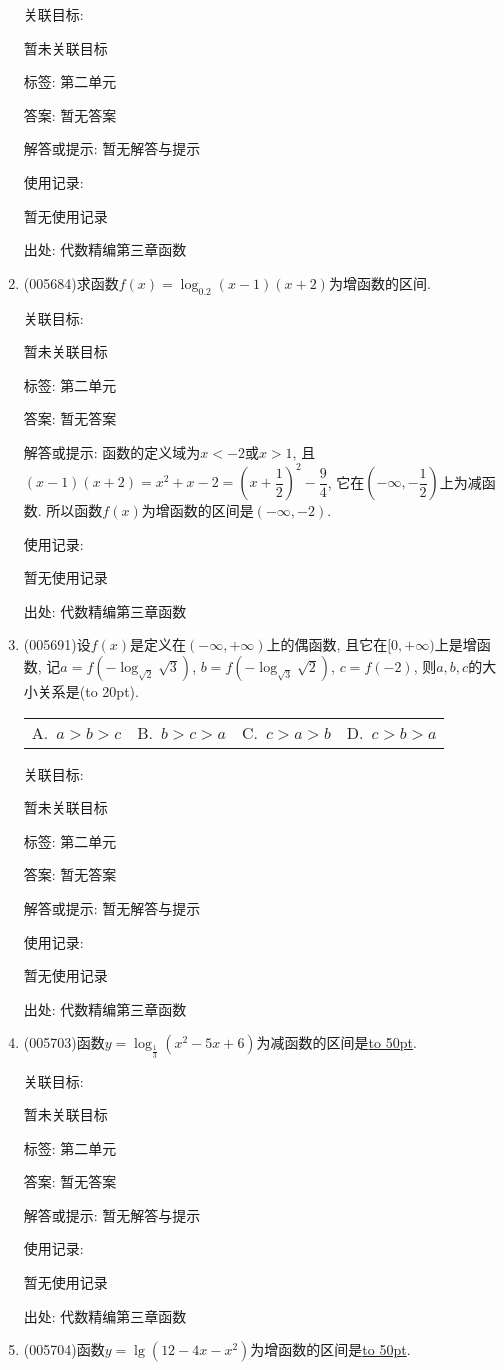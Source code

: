 \documentclass[10pt,a4paper]{article}
\newcommand{\blank}[1]{\underline{\hbox to #1pt{}}}
\newcommand{\bracket}[1]{(\hbox to #1pt{})}
\newcommand{\fourch}[4]{\par\begin{tabular}{p{.23\textwidth}p{.23\textwidth}p{.23\textwidth}p{.23\textwidth}}
A.~#1 &B.~#2& C.~#3& D.~#4
\end{tabular}}
\begin{document}
\begin{enumerate}[1.]
关联目标:

暂未关联目标



标签: 第二单元

答案: 暂无答案

解答或提示: 暂无解答与提示

使用记录:

暂无使用记录


出处: 代数精编第三章函数
\item { (005684)}求函数$f(x)=\log_{0.2}(x-1)(x+2)$为增函数的区间.


关联目标:

暂未关联目标



标签: 第二单元

答案: 暂无答案

解答或提示: 函数的定义域为$x<-2$或$x>1$, 且$(x-1)(x+2)=x^2+x-2=(x+\dfrac 12)^2-\dfrac 94$, 它在$(-\infty ,-\dfrac 12)$上为减函数.
所以函数$f(x)$为增函数的区间是$(-\infty ,-2)$.

使用记录:

暂无使用记录


出处: 代数精编第三章函数
\item { (005691)}设$f(x)$是定义在$(-\infty ,+\infty)$上的偶函数, 且它在$[0,+\infty)$上是增函数, 记$a=f(-\log_{\sqrt 2}\sqrt 3)$, $b=f(-\log_{\sqrt 3}\sqrt 2)$, $c=f(-2)$, 则$a,b,c$的大小关系是\bracket{20}.
\fourch{$a>b>c$}{$b>c>a$}{$c>a>b$}{$c>b>a$}


关联目标:

暂未关联目标



标签: 第二单元

答案: 暂无答案

解答或提示: 暂无解答与提示

使用记录:

暂无使用记录


出处: 代数精编第三章函数
\item { (005703)}函数$y=\log_{\frac 13}(x^2-5x+6)$为减函数的区间是\blank{50}.


关联目标:

暂未关联目标



标签: 第二单元

答案: 暂无答案

解答或提示: 暂无解答与提示

使用记录:

暂无使用记录


出处: 代数精编第三章函数
\item { (005704)}函数$y=\lg (12-4x-x^2)$为增函数的区间是\blank{50}.



\end{enumerate}
\end{document}
